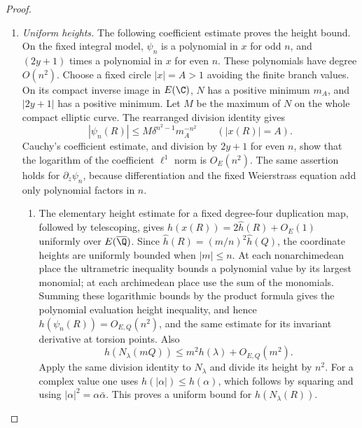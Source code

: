 \begin{proof}
\begin{enumerate}[label=\arabic*.,leftmargin=0pt,labelsep=.5em]
\begin{enumerate}[label=(\alph*),leftmargin=1.3em,labelsep=.5em]
 
\end{enumerate}

\item \emph{Uniform heights.}
The following coefficient estimate proves the height bound.  On the fixed integral model, $\psi_n$ is a polynomial
in $x$ for odd $n$, and $(2y+1)$ times a polynomial in $x$
for even $n$.  These polynomials have degree $O(n^2)$.
Choose a fixed circle $|x|=A>1$ avoiding the finite branch values.
On its compact inverse image in $E(\C)$, $N$ has a positive
minimum $m_A$, and $|2y+1|$ has a positive minimum.  Let $M$
be the maximum of $N$ on the whole compact elliptic curve.
The rearranged division identity gives
\[
 |\psi_n(R)|\leq M\delta^{n^2-1}m_A^{-n^2}
       \qquad(|x(R)|=A).
\]
Cauchy's coefficient estimate, and division by $2y+1$ for
even $n$, show that the logarithm of the coefficient
$\ell^1$ norm is $O_E(n^2)$.  The same assertion holds for
$\partial_z\psi_n$, because differentiation and the fixed
Weierstrass equation add only polynomial factors in $n$.


\begin{enumerate}[label=(\alph*),leftmargin=1.3em,labelsep=.5em]
\item  The elementary height estimate for a fixed degree-four
duplication map, followed by telescoping, gives
$h(x(R))=2\widehat h(R)+O_E(1)$ uniformly over
$E(\overline\Q)$.  Since
$\widehat h(R)=(m/n)^2\widehat h(Q)$, the coordinate heights
are uniformly bounded when $|m|\leq n$.
At each nonarchimedean place the ultrametric inequality bounds a
polynomial value by its largest monomial; at each archimedean
place use the sum of the monomials. Summing these logarithmic
bounds by the product formula gives the polynomial evaluation
height inequality, and hence
$h(\psi_n(R))=O_{E,Q}(n^2)$, and the same estimate for its
invariant derivative at torsion points.  Also
\[
 h(N_\lambda(mQ))\leq m^2h(\lambda)+O_{E,Q}(m^2).
\]
Apply the same division identity to $N_\lambda$ and divide its height by $n^2$.
For a complex value one uses
$h(|\alpha|)\leq h(\alpha)$, which follows by squaring and
using $|\alpha|^2=\alpha\bar\alpha$.
This proves a uniform bound for $h(N_\lambda(R))$.

 
\end{enumerate}


\end{enumerate}
\end{proof}

